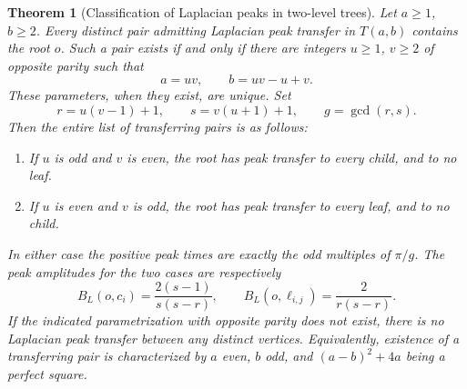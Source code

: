 \documentclass[11pt,a4paper]{article}
\newtheorem{theorem}{Theorem}[section]
\theoremstyle{definition}\newtheorem{definition}[theorem]{Definition}
\theoremstyle{remark}\newtheorem{remark}[theorem]{Remark}
\begin{document}
\begin{theorem}[Classification of Laplacian peaks in two-level trees]
\label{thm:two-level-classification}
Let $a\geq1$, $b\geq2$. Every distinct pair admitting Laplacian peak
transfer in $T(a,b)$ contains the root $o$. Such a pair exists if and
only if there are integers $u\geq1$, $v\geq2$ of opposite parity such
that
\[
 a=uv,\qquad b=uv-u+v.
\]
These parameters, when they exist, are unique. Set
\[
 r=u(v-1)+1,\qquad s=v(u+1)+1,\qquad g=\gcd(r,s).
\]
Then the entire list of transferring pairs is as follows:
\begin{enumerate}
\item If $u$ is odd and $v$ is even, the root has peak transfer to
      every child, and to no leaf.
\item If $u$ is even and $v$ is odd, the root has peak transfer to
      every leaf, and to no child.
\end{enumerate}
In either case the positive peak times are exactly the odd multiples
of $\pi/g$. The peak amplitudes for the two cases are respectively
\[
 B_L(o,c_i)=\frac{2(s-1)}{s(s-r)},\qquad
 B_L(o,\ell_{i,j})=\frac{2}{r(s-r)}.
\]
If the indicated parametrization with opposite parity does not exist,
there is no Laplacian peak transfer between any distinct vertices.
Equivalently, existence of a transferring pair is characterized by
$a$ even, $b$ odd, and $(a-b)^2+4a$ being a perfect square.
\end{theorem}
\end{document}
